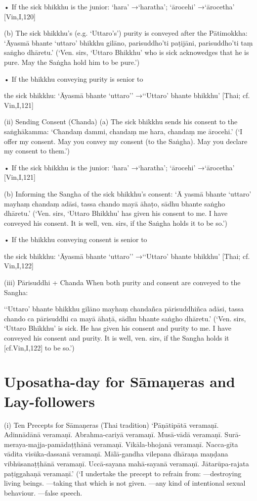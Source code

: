 • If the sick bhikkhu is the junior:
‘hara’ →‘haratha’; ‘ārocehi’ →‘ārocetha’
[Vin,I,120]

(b) The sick bhikkhu’s (e.g. ‘Uttaro’s’)
purity is conveyed after the Pātimokkha:
‘Āyasmā bhante ‘uttaro’ bhikkhu gilāno,
parisuddho’ti paṭijāni,
parisuddho’ti taṃ saṅgho dhāretu.’
(‘Ven. sirs, ‘Uttaro Bhikkhu’ who is sick acknowedges
that he is pure. May the Saṅgha hold him to be pure.’)

• If the bhikkhu conveying purity is senior to

the sick bhikkhu:
‘Āyasmā bhante ‘uttaro’’
→‘‘Uttaro’ bhante bhikkhu’
[Thai; cf. Vin,I,121]

(ii) Sending Consent (Chanda)
(a) The sick bhikkhu sends his consent to
the saṅghākamma:
‘Chandaṃ dammi,
chandaṃ me hara,
chandaṃ me ārocehi.’
(‘I offer my consent. May you convey my consent (to
the Saṅgha). May you declare my consent to them.’)

• If the sick bhikkhu is the junior:
‘hara’ →‘haratha’; ‘ārocehi’ →‘ārocetha’
[Vin,I,121]

(b) Informing the Sangha of the sick
bhikkhu’s consent:
‘Ā yasmā bhante ‘uttaro’
mayhaṃ chandaṃ adāsi,
tassa chando mayā āhaṭo,
sādhu bhante saṅgho dhāretu.’
(‘Ven. sirs, ‘Uttaro Bhikkhu’ has given his consent to
me. I have conveyed his consent. It is well, ven. sirs, if
the Saṅgha holds it to be so.’)

• If the bhikkhu conveying consent is senior to

the sick bhikkhu:
‘Āyasmā bhante ‘uttaro’’
→‘‘Uttaro’ bhante bhikkhu’
[Thai; cf. Vin,I,122]

(iii) Pārisuddhi + Chanda
When both purity and consent are conveyed to
the Sangha:

‘‘Uttaro’ bhante bhikkhu gilāno mayhaṃ
chandañca pārisuddhiñca adāsi,
tassa chando ca pārisuddhi ca mayā āhaṭā,
sādhu bhante saṅgho dhāretu.’
(‘Ven. sirs, ‘Uttaro Bhikkhu’ is sick. He has given his
consent and purity to me. I have conveyed his consent
and purity. It is well, ven. sirs, if the Sangha holds it
[cf.Vin,I,122]
to be so.’)

\section{Uposatha-day for Sāmaṇeras and Lay-followers}

(i) Ten Precepts for Sāmaṇeras (Thai tradition)
‘Pāṇātipātā veramaṇī.
Adinnādānā veramaṇī.
Abrahma-cariyā veramaṇī.
Musā-vādā veramaṇī.
Surā-meraya-majja-pamādaṭṭhānā veramaṇī.
Vikāla-bhojanā veramaṇī.
Nacca-gīta vādita visūka-dassanā veramaṇī.
Mālā-gandha vilepana dhāraṇa maṇḍana
vibhūsanaṭṭhānā veramaṇī.
Uccā-sayana mahā-sayanā veramaṇī.
Jātarūpa-rajata paṭiggahaṇā veramaṇī.’
(‘I undertake the precept to refrain from:
—destroying living beings.
—taking that which is not given.
—any kind of intentional sexual behaviour.
—false speech.

